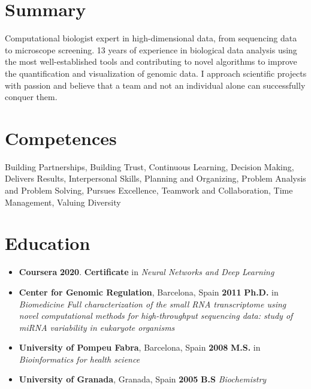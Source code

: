 \hypertarget{summary}{%
\section{Summary}\label{summary}}

Computational biologist expert in high-dimensional data, from sequencing
data to microscope screening. 13 years of experience in biological data
analysis using the most well-established tools and contributing to novel
algorithms to improve the quantification and visualization of genomic
data. I approach scientific projects with passion and believe that a
team and not an individual alone can successfully conquer them.

\hypertarget{competences}{%
\section{Competences}\label{competences}}

Building Partnerships, Building Trust, Continuous Learning, Decision
Making, Delivers Results, Interpersonal Skills, Planning and Organizing,
Problem Analysis and Problem Solving, Pursues Excellence, Teamwork and
Collaboration, Time Management, Valuing Diversity

\hypertarget{education}{%
\section{Education}\label{education}}

\begin{itemize}
\tightlist
\item \textbf{Coursera} \hfill \textbf{2020}.
  \newline
  \textbf{Certificate} in \textit{Neural Networks and Deep Learning}
\item
  \textbf{Center for Genomic Regulation}, Barcelona, Spain \hfill \textbf{2011}
  \newline
  \textbf{Ph.D.} in \textit{Biomedicine}
  \newline
  \textit{Full characterization of the small RNA transcriptome using novel computational methods for high-throughput
sequencing data: study of  miRNA variability in eukaryote organisms}
\item
  \textbf{University of Pompeu Fabra}, Barcelona, Spain \hfill \textbf{2008}
  \newline
  \textbf{M.S.} in \textit{Bioinformatics for health science}
\item
  \textbf{University of Granada}, Granada, Spain \hfill \textbf{2005}
  \newline
  \textbf{B.S} \textit{Biochemistry}
\end{itemize}

